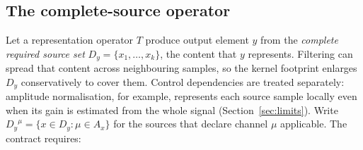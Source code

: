 \documentclass[preprint,3p,11pt,authoryear]{elsarticle}
\newcommand{\Dy}{\ensuremath{D_y}}
\begin{document}
\subsection{The complete-source operator}

Let a representation operator $T$ produce output element $y$ from the
\emph{complete required source set} $\Dy = \{x_1, \dots, x_k\}$, the content
that $y$ represents. Filtering can spread that content across neighbouring
samples, so the kernel footprint enlarges $\Dy$ conservatively to cover them.
Control dependencies are treated separately: amplitude normalisation, for
example, represents each source sample locally even when its gain is estimated
from the whole signal (Section~\ref{sec:limits}). Write
$\Dy^{\mu} = \{x \in \Dy : \mu \in A_x\}$ for the sources that declare channel
$\mu$ applicable. The contract requires:
\end{document}
